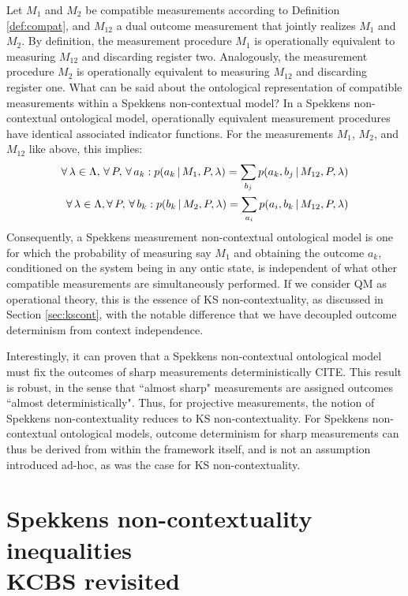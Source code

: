 Let $M_{1}$ and $M_{2}$ be compatible measurements according to Definition \ref{def:compat}, and $M_{12}$ a dual outcome measurement that jointly realizes $M_1$ and $M_2$. By definition, the measurement procedure $M_{1}$ is operationally equivalent to measuring $M_{12}$ and discarding register two. Analogously, the measurement procedure $M_{2}$ is operationally equivalent to measuring $M_{12}$ and discarding register one. What can be said about the ontological representation of compatible measurements within a Spekkens non-contextual model? In a Spekkens non-contextual ontological model, operationally equivalent measurement procedures have identical associated indicator functions. For the measurements $M_{1}$, $M_{2}$, and $M_{12}$ like above, this implies:
\begin{align*}
\forall\thinspace\lambda\in\Lambda,\thinspace\forall \thinspace P,\thinspace\forall\thinspace a_{k}:p(a_{k}\thinspace\vert\thinspace M_{1},P,\lambda)=\sum_{b_{j}}p(a_{k},b_{j}\thinspace\vert\thinspace M_{12},P,\lambda)\\
\forall\thinspace\lambda\in\Lambda,\forall\thinspace P,\thinspace\forall\thinspace b_{k}:p(b_{k}\thinspace\vert\thinspace M_{2},P,\lambda)=\sum_{a_{i}}p(a_{i},b_{k}\thinspace\vert\thinspace M_{12},P,\lambda)
\end{align*}
Consequently, a Spekkens measurement non-contextual ontological model is one for which the probability of measuring say $M_{1}$ and obtaining the outcome $a_{k}$, conditioned on the system being in any ontic state, is independent of what other compatible measurements are simultaneously performed. If we consider QM as operational theory, this is the essence of KS non-contextuality, as discussed in Section \ref{sec:kscont}, with the notable difference that we have decoupled outcome determinism from context independence.

Interestingly, it can proven that a Spekkens non-contextual ontological model must fix the outcomes of sharp measurements deterministically CITE. This result is robust, in the sense that ``almost sharp" measurements are assigned outcomes ``almost deterministically". Thus, for projective measurements, the notion of Spekkens non-contextuality reduces to KS non-contextuality. For Spekkens non-contextual ontological models, outcome determinism for sharp measurements can thus be derived from within the framework itself, and is not an assumption introduced ad-hoc, as was the case for KS non-contextuality.

\section[Spekkens non-contextuality inequalities \\ KCBS revisited]{Spekkens non-contextuality inequalities \\ \large{KCBS revisited}}
\label{sec:spekkensineq}
